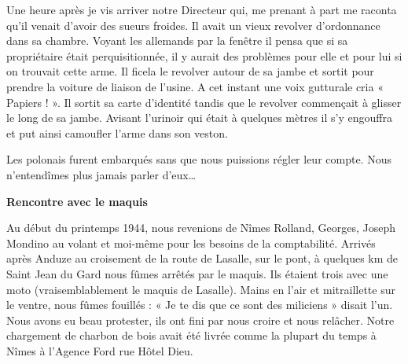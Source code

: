 \vspace{0.45cm}

Une heure après je vis arriver notre Directeur qui, me prenant à part me raconta qu’il venait
d’avoir des sueurs froides. Il avait un vieux revolver d’ordonnance dans sa chambre. Voyant
les allemands par la fenêtre il pensa que si sa propriétaire était perquisitionnée, il y aurait des
problèmes pour elle et pour lui si on trouvait cette arme. Il ficela le revolver autour de sa
jambe et sortit pour prendre la voiture de liaison de l’usine. A cet instant une voix gutturale
cria « Papiers ! ». Il sortit sa carte d’identité tandis que le revolver commençait à glisser le
long de sa jambe. Avisant l’urinoir qui était à quelques mètres il s’y engouffra et put ainsi
camoufler l’arme dans son veston.

\vspace{0.45cm}

Les polonais furent embarqués sans que nous puissions régler leur compte. Nous
n’entendîmes plus jamais parler d’eux…

\vspace{0.55cm}

\textbf{Rencontre avec le maquis}

\vspace{0.35cm}

Au début du printemps 1944, nous revenions de Nîmes Rolland, Georges, Joseph Mondino au
volant et moi-même pour les besoins de la comptabilité. Arrivés après Anduze au croisement
de la route de Lasalle, sur le pont, à quelques km de Saint Jean du Gard nous fûmes arrêtés
par le maquis. Ils étaient trois avec une moto (vraisemblablement le maquis de Lasalle).
Mains en l’air et mitraillette sur le ventre, nous fûmes fouillés : « Je te dis que ce sont des
miliciens » disait l’un. Nous avons eu beau protester, ils ont fini par nous croire et nous
relâcher. Notre chargement de charbon de bois avait été livrée comme la plupart du temps à
Nîmes à l’Agence Ford rue Hôtel Dieu.

